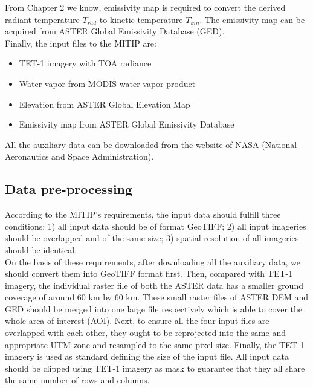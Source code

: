 \noindent From Chapter 2 we know, emissivity map is required to convert the derived radiant temperature $T_{rad}$ to kinetic temperature $T_{kin}$. The emissivity map can be acquired from ASTER Global Emissivity Database (GED).\\

\noindent Finally, the input files to the MITIP are:
\begin{itemize}
\item TET-1 imagery with TOA radiance
\item Water vapor from MODIS water vapor product
\item Elevation from ASTER Global Elevation Map
\item Emissivity map from ASTER Global Emissivity Database
\end{itemize}

\noindent All the auxiliary data can be downloaded from the website of NASA (National Aeronautics and Space Administration).\\


\subsection{Data pre-processing}
According to the MITIP's requirements, the input data should fulfill three conditions: 1) all input data should be of format GeoTIFF; 2) all input imageries should be overlapped and of the same size; 3) spatial resolution of all imageries should be identical.\\

\noindent On the basis of these requirements, after downloading all the auxiliary data, we should convert them into GeoTIFF format first. Then, compared with TET-1 imagery, the individual raster file of both the ASTER data has a smaller ground coverage of around 60 km by 60 km. These small raster files of ASTER DEM and GED should be merged into one large file respectively which is able to cover the whole area of interest (AOI). Next, to ensure all the four input files are overlapped with each other, they ought to be reprojected into the same and appropriate UTM zone and resampled to the same pixel size. Finally, the TET-1 imagery is used as standard defining the size of the input file. All input data should be clipped using TET-1 imagery as mask to guarantee that they all share the same number of rows and columns.\\ 

